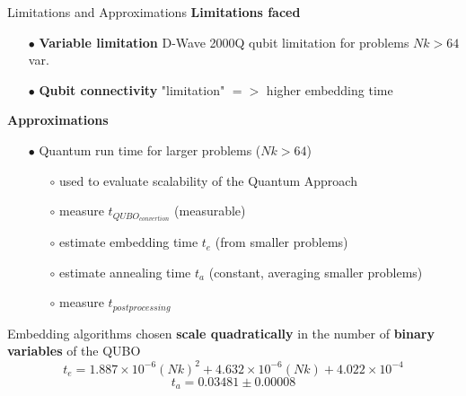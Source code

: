 		\begin{frame}[allowframebreaks]{Limitations and Approximations}
			\textbf{Limitations faced}
			\begin{itemize}
				\item[$\bullet$] \textbf{Variable limitation} D-Wave 2000Q qubit limitation for problems $Nk > 64$ var.
				\item[$\bullet$] \textbf{Qubit connectivity} "limitation" $=>$ higher embedding time
			\end{itemize}
			\textbf{Approximations}
			\begin{itemize}
				\item[$\bullet$] Quantum run time for larger problems ($Nk > 64$)
				\begin{itemize}
					\item[$\circ$] used to evaluate scalability of the Quantum Approach
					\item[$\circ$] measure $t_{QUBO_{convertion}}$ (measurable)
					\item[$\circ$] estimate embedding time $t_{e}$ (from smaller problems)
					\item[$\circ$] estimate annealing time $t_{a}$ (constant, averaging smaller problems) 
					\item[$\circ$] measure $t_{postprocessing}$
				\end{itemize} 
			\end{itemize}
			Embedding algorithms chosen \textbf{scale quadratically} in the number of \textbf{binary variables} of the QUBO
			\begin{equation}
				t_{e} = 1.887 \times 10^{-6}(Nk)^2 
				+ 4.632 \times 10^{-6}(Nk)
				+ 4.022 \times 10^{-4}
			\end{equation}
			\begin{equation}
				t_{a} = 0.03481 \pm 0.00008
			\end{equation}

		\end{frame}

